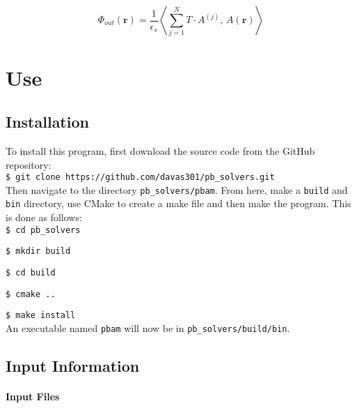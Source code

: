 \[\Phi_{out}(\textbf{r})= \frac{1}{\epsilon_s} \left \langle \sum_{j = 1}^N  T \cdot A^{(j) } , \,  A(\textbf{r})  \right \rangle \]

\clearpage


\chapter{Use}

\section{Installation}

To install this program, first download the source code from the GitHub repository: \\

\hspace{1cm}\texttt{\$ git clone https://github.com/davas301/pb\_solvers.git} \\

Then navigate to the directory \texttt{pb\_solvers/pbam}. From here, make a \texttt{build} and \texttt{bin} directory, use CMake to create a make file and then make the program.  This is done as follows: \\

\hspace{1cm}\texttt{\$ cd pb\_solvers} 

\hspace{1cm}\texttt{\$ mkdir build}

\hspace{1cm}\texttt{\$ cd build}

\hspace{1cm}\texttt{\$ cmake ..} 

\hspace{1cm}\texttt{\$ make install} \\

An executable named \texttt{pbam} will now be in \texttt{pb\_solvers/build/bin}.

\section{Input Information}

\subsubsection{Input Files}

